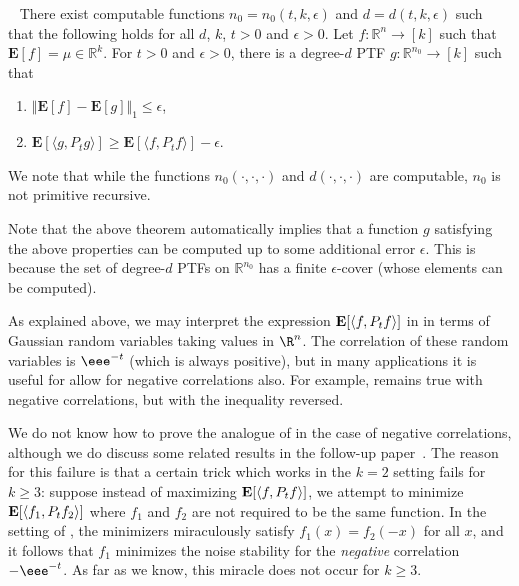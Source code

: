 \documentclass{toc}
\newcommand{\E}{{\bf E}}
\begin{document}
\begin{theorem}~\label{thm:main-stab}
There exist computable functions $n_0 = n_0(t, k, \epsilon)$ and $d= d(t, k, \epsilon)$ such that the following holds for all $d$, $k$, $t>0$ and $\epsilon>0$. 
Let $f: \mathbb{R}^n \rightarrow [k]$ such that $\mathbf{E}[f] = \mu \in \mathbb{R}^k$. For $t>0$ and $\epsilon>0$,  there is a degree-$d$ PTF $g: \mathbb{R}^{n_0} \rightarrow [k]$ such that 
\begin{enumerate}
\item $\Vert \mathbf{E}[f] - \mathbf{E}[g] \Vert_1 \le \epsilon$, 
\item $\mathbf{E}[\langle g, P_t g \rangle] \ge \mathbf{E}[\langle f, P_t f \rangle] - \epsilon$.
\end{enumerate}
%
We note  %
that while the functions $n_0(\cdot, \cdot, \cdot)$ and $d(\cdot, \cdot, \cdot)$ are computable, $n_0$ is not primitive recursive.
\end{theorem}

Note that the above theorem automatically implies that a function $g$ satisfying the above properties can be  computed up to some additional error $\epsilon$. This is because the set of degree-$d$ PTFs on $\mathbb{R}^{n_0}$ has a finite $\epsilon$-cover (whose elements 
can be computed). 

\begin{remark}
    As explained above, we may interpret the expression $\E[\langle f, P_t f
      \rangle]$
in  %
     in terms of Gaussian random variables
    taking values in $\R^n$. The correlation of these random
    variables is $\eee^{-t}$ (which is always positive), but in many applications
    it is useful for allow for negative correlations also.
    For example,  remains true with negative
    correlations, but with the inequality reversed.

    We do not know how to prove the analogue of  in
    the case of negative correlations, although we do discuss some related
    results in the follow-up paper~\cite{DMN:17b}. The reason for this failure
    is that a certain trick which works in the $k=2$ setting fails for $k\ge3$:
    suppose instead of maximizing $\E[\langle f, P_t f \rangle]$, we attempt to
    minimize $\E[\langle f_1, P_t f_2 \rangle]$ where $f_1$ and $f_2$ are not
    required to be the same function. In the setting of
    , the minimizers miraculously satisfy $f_1(x) =
    f_2(-x)$ for all $x$, and it follows that $f_1$ minimizes the noise stability
    for the \emph{negative} correlation $-\eee^{-t}$. As far as we know,
    this miracle does not occur for $k \ge 3$.
\end{remark}
\end{document}

